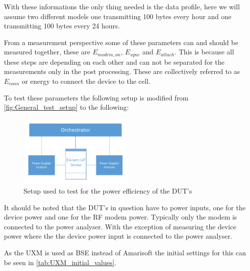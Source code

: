 With these informations the only thing needed is the data profile, here we will assume two different models one transmitting 100 bytes every hour and one transmitting 100 bytes every 24 hours. 

From a measurement perspective some of these parameters can and should be measured together, these are $E_{modem,on}$, $E_{sync}$ and $E_{attach}$. This is because all these steps are depending on each other and can not be separated for the measurements only in the post processing. These are collectively referred to as $E_{conn}$ or energy to connect the device to the cell. 

To test these parameters the following setup is modified from \autoref{fig:General_test_setup} to the following:

\begin{figure}[H]
\centering
\includegraphics[width=0.5\textwidth]{figures/IPE_test_setup.pdf}
\caption{Setup used to test for the power efficiency of the \gls{DUT}'s}
\label{fig:IPE_test_setup}
\end{figure}

It should be noted that the \gls{DUT}'s in question have to power inputs, one for the device power and one for the RF modem power. Typically only the modem is connected to the power analyser. With the exception of measuring the device power where the the device power input is connected to the power analyser.

As the UXM is used as \gls{BSE} instead of Amarisoft the initial settings for this can be seen in \autoref{tab:UXM_initial_values}.

